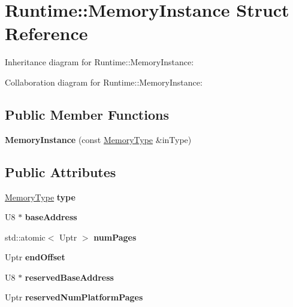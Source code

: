 \hypertarget{struct_runtime_1_1_memory_instance}{}\section{Runtime\+:\+:Memory\+Instance Struct Reference}
\label{struct_runtime_1_1_memory_instance}


Inheritance diagram for Runtime\+:\+:Memory\+Instance\+:


Collaboration diagram for Runtime\+:\+:Memory\+Instance\+:
\subsection*{Public Member Functions}
\begin{DoxyCompactItemize}
\item 
\mbox{\label{struct_runtime_1_1_memory_instance_a7feb7d2add6de802c26d19aa79ebc35f}} 
{\bfseries Memory\+Instance} (const \mbox{\hyperlink{struct_i_r_1_1_memory_type}{Memory\+Type}} \&in\+Type)
\end{DoxyCompactItemize}
\subsection*{Public Attributes}
\begin{DoxyCompactItemize}
\item 
\mbox{\label{struct_runtime_1_1_memory_instance_a5cf279001f7209f2b7be6b7c13abe01a}} 
\mbox{\hyperlink{struct_i_r_1_1_memory_type}{Memory\+Type}} {\bfseries type}
\item 
\mbox{\label{struct_runtime_1_1_memory_instance_ad803e69957989e4087929b8a12f25440}} 
U8 $\ast$ {\bfseries base\+Address}
\item 
\mbox{\label{struct_runtime_1_1_memory_instance_aea69f8ac1642263f4580fcc56ff9833f}} 
std\+::atomic$<$ Uptr $>$ {\bfseries num\+Pages}
\item 
\mbox{\label{struct_runtime_1_1_memory_instance_a58d518883da46e9fa78c228b4ffac918}} 
Uptr {\bfseries end\+Offset}
\item 
\mbox{\label{struct_runtime_1_1_memory_instance_a1f6050dbc41669dbc56d6f02acdd15a6}} 
U8 $\ast$ {\bfseries reserved\+Base\+Address}
\item 
\mbox{\label{struct_runtime_1_1_memory_instance_ada6632cfe01689c3720adae35964e449}} 
Uptr {\bfseries reserved\+Num\+Platform\+Pages}
\end{DoxyCompactItemize}
